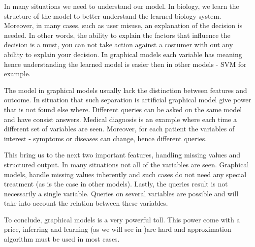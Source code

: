 In many situations we need to understand our model.
In biology, we learn the structure of the model to better understand the learned biology system.
Moreover, in many cases, such as user misuse, an explanation of the decision is needed. 
In other words, the ability to explain the factors that influence the decision is a must, you can not take action against a costumer with out any ability to explain your decision. 
In graphical models each variable has meaning hence understanding the learned model is easier then in other models - SVM for example.

The model in graphical models usually lack the distinction between features and outcome.
In situation that such separation is artificial graphical model give power that is not found else where.
Different queries can be asked on the same model and have consist answers.
Medical diagnosis is an example where each time a different set of variables are seen.
Moreover, for each patient the variables of interest - symptoms or diseases can change, hence different queries.

This bring us to the next two important features, handling missing values and structured output.
In many situations not all of the variables are seen.
Graphical models, handle missing values inherently and such cases do not need any special treatment (as is the case in other models).
Lastly, the queries result is not necessarily a single variable.
Queries on several variables are possible and will take into account the relation between these variables.

To conclude, graphical models is a very powerful toll.
This power come with a price,  inferring and learning (as we will see in )are hard and approximation algorithm must be used in most cases.
